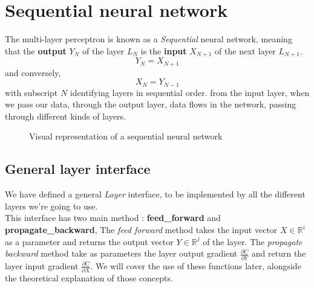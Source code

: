 \documentclass[a4paper, twocolumn, twoside]{article}
\def\nstyle{int(\lay<\Nnodlen?min(2,\lay):3)} %
\begin{document}
	\section{Sequential neural network}
	The multi-layer perceptron is known  as a \textit{Sequential} neural network, meaning that the \textbf{output}
	$Y_N$ of the layer $L_N$ is the \textbf{input} $X_{N+1}$ of the next layer $L_{N+1}$.\\
	$$
	Y_{N} = X_{N+1}
	$$
	and conversely,
	$$
	X_{N} = Y_{N-1}
	$$
	with subscript $N$ identifying layers in sequential order.
	from the input layer, when we pass our data,
	through the output layer, data flows in the network, passing
	through different kinds of layers.

      \begin{figure}
      \centering
        \caption{Visual representation of a sequential neural network}
    \end{figure}

	\subsection{General layer interface}
	We have defined a general \textit{Layer} interface, to be implemented by all the different layers we're going to use.\\
	This interface has two main method : \textbf{feed\_forward} and \textbf{propagate\_backward},
	The \textit{feed forward} method takes the input vector $X \in \mathbb{R}^i$ as a parameter and returns the output vector $Y \in \mathbb{R}^j$ of the layer.
	The \textit{propagate backward} method take as parameters the layer output gradient $\frac{\partial C}{\partial Y}$ and return the layer input gradient $\frac{\partial C}{\partial X}$.
	We will cover the use of these functions later, alongside the theoretical explanation of those concepts.
\end{document}
